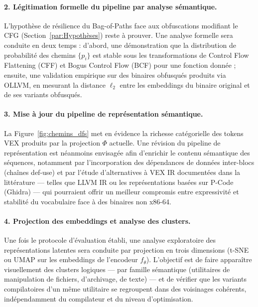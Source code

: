 \paragraph{2. Légitimation formelle du pipeline par analyse sémantique.}
L'hypothèse de résilience du Bag-of-Paths face aux obfuscations modifiant le CFG
(Section~\ref{par:Hypothèses}) reste à prouver. Une analyse formelle sera conduite en deux
temps : d'abord, une démonstration que la distribution de probabilité des chemins
$\{p_i\}$ est stable sous les transformations de Control Flow Flattening (CFF) et
Bogus Control Flow (BCF) pour une fonction donnée ; ensuite, une validation empirique
sur des binaires obfusqués produits via OLLVM, en mesurant la distance $\ell_2$ entre
les embeddings du binaire original et de ses variants obfusqués.

\paragraph{3. Mise à jour du pipeline de représentation sémantique.}
La Figure~\ref{fig:chemins_dfs} met en évidence la richesse catégorielle des tokens
VEX produits par la projection $\Phi$ actuelle. Une révision du pipeline de représentation
est néanmoins envisagée afin d'enrichir le contenu sémantique des séquences, notamment
par l'incorporation des dépendances de données inter-blocs (chaînes def-use) et par
l'étude d'alternatives à VEX IR documentées dans la littérature — telles que LLVM IR ou
les représentations basées sur P-Code (Ghidra) — qui pourraient offrir un meilleur
compromis entre expressivité et stabilité du vocabulaire face à des binaires non x86-64.

\paragraph{4. Projection des embeddings et analyse des clusters.}
Une fois le protocole d'évaluation établi, une analyse exploratoire des représentations
latentes sera conduite par projection en trois dimensions (t-SNE ou UMAP sur les
embeddings de l'encodeur $f_\theta$). L'objectif est de faire apparaître visuellement des
clusters logiques — par famille sémantique (utilitaires de manipulation de fichiers,
d'archivage, de texte) — et de vérifier que les variants compilatoires d'un même
utilitaire se regroupent dans des voisinages cohérents, indépendamment du compilateur
et du niveau d'optimisation.

